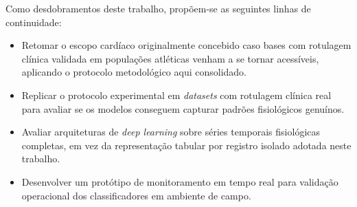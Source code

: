 Como desdobramentos deste trabalho, propõem-se as seguintes linhas de continuidade:
\begin{itemize}
    \item Retomar o escopo cardíaco originalmente concebido caso bases com rotulagem clínica validada em populações atléticas venham a se tornar acessíveis, aplicando o protocolo metodológico aqui consolidado.
    \item Replicar o protocolo experimental em \textit{datasets} com rotulagem clínica real para avaliar se os modelos conseguem capturar padrões fisiológicos genuínos.
    \item Avaliar arquiteturas de \textit{deep learning} sobre séries temporais fisiológicas completas, em vez da representação tabular por registro isolado adotada neste trabalho.
    \item Desenvolver um protótipo de monitoramento em tempo real para validação operacional dos classificadores em ambiente de campo.
\end{itemize}





